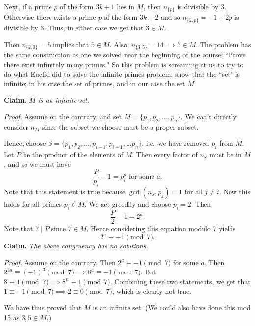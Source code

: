 \documentclass{article}
\begin{document}
    \vspace{2mm}
    \qquad Next, if a prime $p$ of the form $3k + 1$ lies in $M$, then $n_{\{p\}}$ is divisible by $3$. Otherwise there exists a prime $p$ of the form $3k + 2$ and so $n_{\{2,p\}} = -1 + 2p$ is divisible by $3$. Thus, in either case we get that $3 \in M$.
    
    \vspace{2mm}
    \qquad Then $n_{\{2,3\}} = 5$ implies that $5 \in M$. Also, $n_{\{3,5\}} = 14 \implies 7 \in M$. The problem has the same construction as one we solved near the beginning of the course: ``Prove there exist infinitely many primes." So this problem is screaming at us to try to do what Euclid did to solve the infinite primes problem: show that the ``set" is infinite; in his case the set of primes, and in our case the set $M$.
    
    \vspace{2mm}
    \textbf{Claim.} \textit{$M$ is an infinite set.}
    
    \vspace{2mm}
    \textit{Proof.} Assume on the contrary, and set $M = \{p_{1}, p_{2}, \dots, p_{n}\}$. We can't directly consider $n_{M}$ since the subset we choose must be a proper subset.
    
    \vspace{2mm}
    Hence, choose $S = \{p_{1}, p_{2}, \dots, p_{i-1}, p_{i+1}, \dots p_{n}\}$, i.e.\ we have removed $p_{i}$ from $M$. Let $P$ be the product of the elements of $M$. Then every factor of $n_{S}$ must be in $M$, and so we must have $$\frac{P}{p_{i}} - 1 = p_{i}^{a} \text{ for some $a$.}$$ Note that this statement is true because $\gcd(n_{S}, p_{j}) = 1$ for all $j \ne i$. Now this holds for all primes $p_{i} \in M$. We act greedily and choose $p_{i} = 2$. Then $$\frac{P}{2} - 1 = 2^{a}.$$ Note that $7 \mid P$ since $7 \in M$. Hence considering this equation modulo 7 yields $$2^{a} \equiv -1 \pmod{7}.$$
    \textbf{Claim.} \textit{The above congruency has no solutions.}
    
    \vspace{2mm}
    \textit{Proof.} Assume on the contrary. Then $2^{a} \equiv -1 \pmod{7}$ for some $a$. Then $2^{3a} \equiv (-1)^{3} \pmod{7} \implies 8^{a} \equiv -1 \pmod{7}$. But $8 \equiv 1 \pmod{7} \implies 8^{n} \equiv 1 \pmod{7}$. Combining these two statements, we get that $1 \equiv -1 \pmod{7} \implies 2 \equiv 0 \pmod{7}$, which is clearly not true.
    
    \vspace{2mm}
    \qquad We have thus proved that $M$ is an infinite set. (We could also have done this mod 15 as $3, 5 \in M$.)
    
\end{document}

